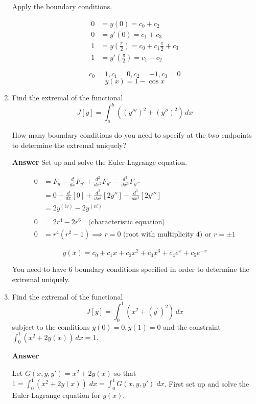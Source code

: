\documentclass[12pt]{article}
\begin{document}
\begin{enumerate}
Apply the boundary conditions.

\begin{align*}
0 &= y(0) = c_0 + c_2 \\
0 &= y'(0) = c_1 + c_3 \\
1 &= y\left(\frac{\pi}{2}\right) = c_0 + c_1\frac{\pi}{2} + c_3\\
1 &= y'\left(\frac{\pi}{2}\right) = c_1-c_2
\end{align*}

$$c_0 = 1, c_1 = 0, c_2 = -1, c_3 = 0 $$
$$\boxed{y(x) = 1 - \cos x} $$

\newpage
\item Find the extremal of the functional
$$
J[y] = \int_a ^b \left((y''')^2  + (y'')^2  \right)\,dx
$$

How many boundary conditions do you need to specify at the two endpoints to determine the extremal uniquely?

{\bf Answer} Set up and solve the Euler-Lagrange equation.

\begin{align*}
0 &= F_y - \frac{d}{dx}F_{y'} + \frac{d^2}{dx^2}F_{y''} - \frac{d^3}{dx^3}F_{y'''} \\
&= 0 - \frac{d}{dx}[0] + \frac{d^2}{dx^2}[2y''] - \frac{d^3}{dx^3}[2y'''] \\
&= 2y^{(iv)} - 2y^{(vi)} \\
& \\
0 &= 2r^4 - 2r^6 \quad \text{(characteristic equation)} \\
0 &= r^4(r^2-1) \implies r = 0 \text{ (root with multiplicity 4) or } r= \pm 1 
\end{align*}

$$\boxed{ y(x) = c_0 + c_1x +c_2x^2 + c_3x^3 + c_4e^x + c_5e^{-x}}$$

You need to have 6 boundary conditions specified in order to determine the extremal uniquely.

\newpage

\item Find the extremal of the functional
$$
J[y] = \int_0^1 \left( x^2 + (y^{\prime})^2 \right) \,dx
$$
subject to the conditions $y(0) = 0, y(1) = 0$ and the constraint $\int_0^1 \left( x^2 + 2 y(x) \right)\,dx = 1$.

{\bf Answer}

Let $G(x,y,y') = x^2 + 2y(x)$ so that $1 = \int_0^1 \left( x^2 +2y(x)\right) \; dx = \int_0^1 G(x,y,y') \; dx$. First set up and solve the Euler-Lagrange equation for $y(x)$. 


\end{enumerate}
\end{document}
